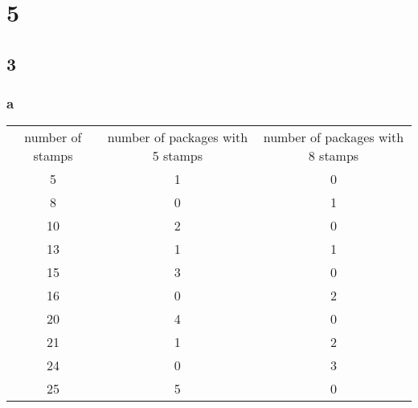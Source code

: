\documentclass{article}
\begin{document}
\section{5}
\subsection{3}
\subsubsection{a}
\begin{tabular}{c|c|c}
     number of stamps & number of packages with 5 stamps & number of packages with 8 stamps \\
     5 & 1 & 0 \\ 
     8 & 0 & 1\\ 
     10 & 2 & 0\\ 
     13 & 1 & 1\\ 
     15 & 3 & 0\\ 
     16 & 0 & 2\\ 
     20 & 4 & 0\\ 
     21 & 1 & 2\\
     24 & 0 & 3\\ 
     25 & 5 & 0\\
\end{tabular}
\end{document}
